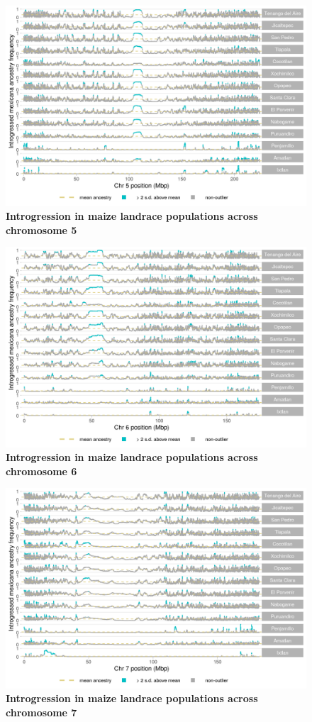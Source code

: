 \begin{figure}[ht]
\includegraphics[width=.85\textwidth]{chapter2/figures/maize_shared_outliers_chr_5.png}
\caption{\color{Gray} \textbf{Introgression in maize landrace populations across chromosome 5}}
\label{maize_chr5}
\end{figure}

\begin{figure}[ht]
\includegraphics[width=.85\textwidth]{chapter2/figures/maize_shared_outliers_chr_6.png}
\caption{\color{Gray} \textbf{Introgression in maize landrace populations across chromosome 6}}
\label{maize_chr6}
\end{figure}

\begin{figure}[ht]
\includegraphics[width=.85\textwidth]{chapter2/figures/maize_shared_outliers_chr_7.png}
\caption{\color{Gray} \textbf{Introgression in maize landrace populations across chromosome 7}}
\label{maize_chr7}
\end{figure}

